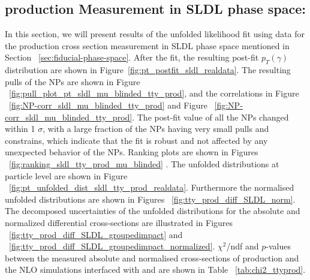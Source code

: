 \subsection{\tty production Measurement in SLDL phase space:}
\label{sec:tty_prod_sldl_measurement}

In this section, we will present results of the unfolded likelihood fit using data for the \tty production cross section measurement in SLDL phase space mentioned in Section ~\ref{sec:fiducial-phase-space}. After the fit, the resulting post-fit $p_T(\gamma)$ distribution are shown in Figure~\ref{fig:pt_postfit_sldl_realdata}. The resulting pulls of the NPs  are shown in Figure ~\ref{fig:pull_plot_pt_sldl_mu_blinded_tty_prod}, and the correlations in Figure ~\ref{fig:NP-corr_sldl_mu_blinded_tty_prod} and Figure ~\ref{fig:NP-corr_sldl_mu_blinded_tty_prod}. The post-fit value of all the NPs changed within 1 $\sigma$, with a large fraction of the NPs having very small pulls and constrains, which indicate that the fit is robust and not affected by any unexpected behavior of the NPs. Ranking plots are shown in Figures ~\ref{fig:ranking_sldl_tty_prod_mu_blinded} . The unfolded distributions at particle level are shown in Figure ~\ref{fig:pt_unfolded_dist_sldl_tty_prod_realdata}. Furthermore the normalised unfolded distributions are shown in Figures ~\ref{fig:tty_prod_diff_SLDL_norm}. The decomposed uncertainties of the unfolded distributions for the absolute and normalized differential cross-sections are illustrated in Figures ~\ref{fig:tty_prod_diff_SLDL_groupedimpact} and ~\ref{fig:tty_prod_diff_SLDL_groupedimpact_normalized}.   $\chi^2$/ndf and $p$-values between the measured absolute and normalised cross-sections of \tty production and the NLO \MGNLO simulations interfaced with \PYTHIA[8] and \HERWIG[7] are shown in Table ~\ref{tab:chi2_ttyprod}.


